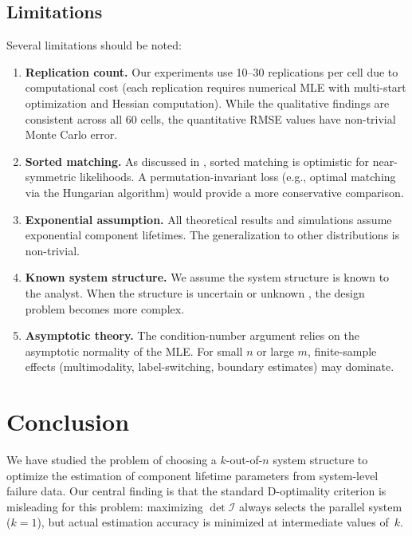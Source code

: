 \documentclass[12pt]{article}
\theoremstyle{definition}
\theoremstyle{remark}
\begin{document}
\subsection{Limitations}
\label{sec:limitations}

Several limitations should be noted:

\begin{enumerate}
  \item \textbf{Replication count.}  Our experiments use 10--30
    replications per cell due to computational cost (each replication
    requires numerical MLE with multi-start optimization and Hessian
    computation).  While the qualitative findings are consistent across
    all 60 cells, the quantitative RMSE values have non-trivial Monte
    Carlo error.

  \item \textbf{Sorted matching.}  As discussed in
    , sorted matching is optimistic for
    near-symmetric likelihoods.  A permutation-invariant loss
    (e.g., optimal matching via the Hungarian algorithm) would provide
    a more conservative comparison.

  \item \textbf{Exponential assumption.}  All theoretical results and
    simulations assume exponential component lifetimes.  The
    generalization to other distributions is non-trivial.

  \item \textbf{Known system structure.}  We assume the system
    structure is known to the analyst.  When the structure is
    uncertain or unknown \citep{YangNgBalakrishnan2019}, the design
    problem becomes more complex.

  \item \textbf{Asymptotic theory.}  The condition-number argument
    relies on the asymptotic normality of the MLE.  For small $n$ or
    large $m$, finite-sample effects (multimodality,
    label-switching, boundary estimates) may dominate.
\end{enumerate}


\section{Conclusion}
\label{sec:conclude}

We have studied the problem of choosing a $k$-out-of-$n$ system
structure to optimize the estimation of component lifetime parameters
from system-level failure data.  Our central finding is that the
standard D-optimality criterion is misleading for this problem:
maximizing $\det \mathcal{I}$ always selects the parallel system
($k = 1$), but actual estimation accuracy is minimized at
intermediate values of~$k$.
\end{document}
